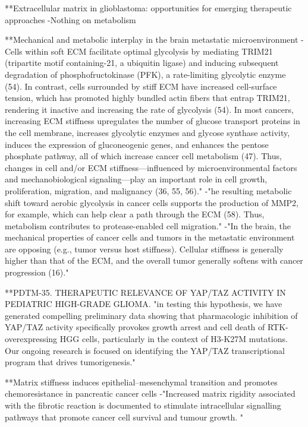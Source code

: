 \documentclass[11pt,a4paper]{article}
\begin{document}
**Extracellular matrix in glioblastoma: opportunities for emerging therapeutic approaches
-Nothing on metabolism

**Mechanical and metabolic interplay in the brain metastatic microenvironment
-Cells within soft ECM facilitate optimal glycolysis by mediating TRIM21 (tripartite motif containing-21, a ubiquitin ligase) and inducing subsequent degradation of phosphofructokinase (PFK), a rate-limiting glycolytic enzyme (54). In contrast, cells surrounded by stiff ECM have increased cell-surface tension, which has promoted highly bundled actin fibers that entrap TRIM21, rendering it inactive and increasing the rate of glycolysis (54). In most cancers, increasing ECM stiffness upregulates the number of glucose transport proteins in the cell membrane, increases glycolytic enzymes and glycose synthase activity, induces the expression of gluconeogenic genes, and enhances the pentose phosphate pathway, all of which increase cancer cell metabolism (47). Thus, changes in cell and/or ECM stiffness—influenced by microenvironmental factors and mechanobiological signaling—play an important role in cell growth, proliferation, migration, and malignancy (36, 55, 56)."
-"he resulting metabolic shift toward aerobic glycolysis in cancer cells supports the production of MMP2, for example, which can help clear a path through the ECM (58). Thus, metabolism contributes to protease-enabled cell migration."
-"In the brain, the mechanical properties of cancer cells and tumors in the metastatic environment are opposing (e.g., tumor versus host stiffness). Cellular stiffness is generally higher than that of the ECM, and the overall tumor generally softens with cancer progression (16)."

**PDTM-35. THERAPEUTIC RELEVANCE OF YAP/TAZ ACTIVITY IN PEDIATRIC HIGH-GRADE GLIOMA.
"in testing this hypothesis, we have generated compelling preliminary data showing that pharmacologic inhibition of YAP/TAZ activity specifically provokes growth arrest and cell death of RTK-overexpressing HGG cells, particularly in the context of H3-K27M mutations. Our ongoing research is focused on identifying the YAP/TAZ transcriptional program that drives tumorigenesis."

**Matrix stiffness induces epithelial–mesenchymal transition and promotes chemoresistance in pancreatic cancer cells
-"Increased matrix rigidity associated with the fibrotic reaction is documented to stimulate intracellular signalling pathways that promote cancer cell survival and tumour growth. "
\end{document}

